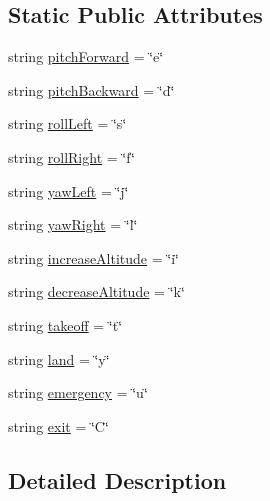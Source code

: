 \subsection*{Static Public Attributes}
\begin{DoxyCompactItemize}
\item 
string \hyperlink{classkeyboardcontroller_1_1keyMapping_a95735ece4ea89e929997208cc3363fda}{pitch\-Forward} = \char`\"{}e\char`\"{}
\item 
string \hyperlink{classkeyboardcontroller_1_1keyMapping_ac4ef085e346792c599629fcca0f5fc71}{pitch\-Backward} = \char`\"{}d\char`\"{}
\item 
string \hyperlink{classkeyboardcontroller_1_1keyMapping_ae5a47e7e559336ceb20278098654bfc6}{roll\-Left} = \char`\"{}s\char`\"{}
\item 
string \hyperlink{classkeyboardcontroller_1_1keyMapping_a460251be64a92ea67630150f33bc26eb}{roll\-Right} = \char`\"{}f\char`\"{}
\item 
string \hyperlink{classkeyboardcontroller_1_1keyMapping_a8fe5634f1db0cb7509ec14446df8c6e3}{yaw\-Left} = \char`\"{}j\char`\"{}
\item 
string \hyperlink{classkeyboardcontroller_1_1keyMapping_ad8449d6f438051685c76384a797b2bff}{yaw\-Right} = \char`\"{}l\char`\"{}
\item 
string \hyperlink{classkeyboardcontroller_1_1keyMapping_a7ef26c2eec93d9bf3124f0e360628dd7}{increase\-Altitude} = \char`\"{}i\char`\"{}
\item 
string \hyperlink{classkeyboardcontroller_1_1keyMapping_ac55858cf442801f88d3919ba6162d82d}{decrease\-Altitude} = \char`\"{}k\char`\"{}
\item 
string \hyperlink{classkeyboardcontroller_1_1keyMapping_aaea5bb05c7a1f0dc6353fe686b5a8159}{takeoff} = \char`\"{}t\char`\"{}
\item 
string \hyperlink{classkeyboardcontroller_1_1keyMapping_a63eed8388261cf53c15e26e4e67e1037}{land} = \char`\"{}y\char`\"{}
\item 
string \hyperlink{classkeyboardcontroller_1_1keyMapping_af509f5078d3f610944639779a75710aa}{emergency} = \char`\"{}u\char`\"{}
\item 
string \hyperlink{classkeyboardcontroller_1_1keyMapping_a7c54d8a727c232de27f46de6f3dd5b8a}{exit} = \char`\"{}C\char`\"{}
\end{DoxyCompactItemize}


\subsection{Detailed Description}


